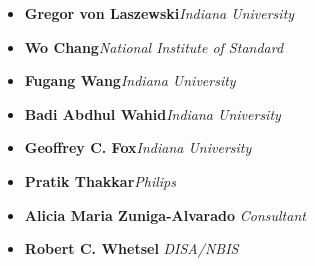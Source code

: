 \begin{itemize}
\item {{\bf Gregor von Laszewski}{\it Indiana University}} 
\item {{\bf Wo Chang}{\it National Institute of Standard}} 
\item {{\bf Fugang Wang}{\it Indiana University}}  
\item {{\bf Badi Abdhul Wahid}{\it Indiana University}} 
\item {{\bf Geoffrey C. Fox}{\it Indiana University}} 
\item {{\bf Pratik Thakkar}{\it Philips}} 
\item {{\bf Alicia Maria Zuniga-Alvarado} {\it Consultant}} 
\item {{\bf Robert C. Whetsel} {\it DISA/NBIS}} 
\end{itemize}


